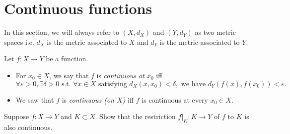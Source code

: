 \section{Continuous functions}
\label{sec:2_1}
In this section, we will always refer to $(X,d_X)$ and $(Y,d_Y)$ as two metric spaces i.e. $d_X$ is the metric associated to $X$ and $d_Y$ is the metric associated to $Y$.
\begin{defn}
\label{defn:cty}
Let $f:X\to Y$ be a function.
\begin{itemize}
	\item For $x_0\in X$, we say that $f$ is \textit{continuous at $x_0$} iff
	\[
	\forall \varepsilon>0,\exists \delta>0\text{ s.t. }\forall x\in X\text{ satisfying }d_X(x,x_0)<\delta,\text{ we have }d_Y(f(x),f(x_0))<\varepsilon.
	\]
	\item We saw that $f$ is \textit{continuous (on $X$)} iff $f$ is continuous at every $x_0\in X$.
\end{itemize}
\end{defn}
\begin{ex}
Suppose $f:X\to Y$ and $K\subset X$. Show that the restriction $f|_K:K\to Y$ of $f$ to $K$ is also continuous.
\end{ex}
